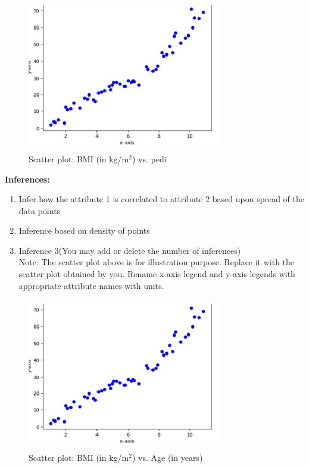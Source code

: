 \documentclass[12 pt, a4paper]{article}
\theoremstyle{definition}
\begin{document}
\begin{figure}[H]
	\centering
	\includegraphics[width=8.5cm,height=6.65cm]{Scatter Plot.png}
	\caption{Scatter plot: BMI (in kg/m$^{2 }$) vs. pedi}
	\label{Blockdia}
\end{figure}

\textbf{\Large Inferences:}
\begin{enumerate}
   \item Infer how the attribute 1 is correlated to attribute 2 based upon spread of the data points
   \item Inference based on density of points
   \item Inference 3(You may add or delete the number of inferences)
\\Note: The scatter plot above is for illustration purpose. Replace it with the scatter plot obtained by you. Rename x-axis legend and y-axis legends with appropriate attribute names with units.

\end{enumerate}

\begin{figure}[H]
	\centering
	\includegraphics[width=8.5cm,height=6.65cm]{Scatter Plot.png}
	\caption{Scatter plot: BMI (in kg/m$^{2 }$) vs. Age (in years)}
	\label{Blockdia}
\end{figure}
\end{document}
